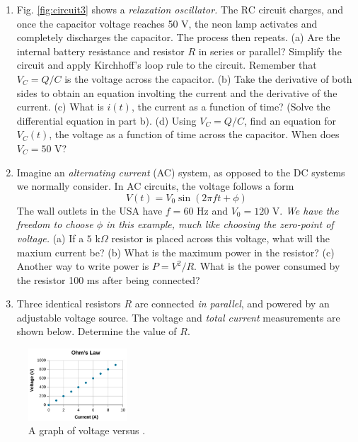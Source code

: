 \documentclass[10pt]{article}
\begin{document}
\begin{enumerate}
\item Fig. \ref{fig:circuit3} shows a \textit{relaxation oscillator.}  The RC circuit charges, and once the capacitor voltage reaches 50 V, the neon lamp activates and completely discharges the capacitor.  The process then repeats. (a) Are the internal battery resistance and resistor $R$ in series or parallel?  Simplify the circuit and apply Kirchhoff's loop rule to the circuit. Remember that $V_C = Q/C$ is the voltage across the capacitor.  (b) Take the derivative of both sides to obtain an equation involting the current and the derivative of the current.  (c) What is $i(t)$, the current as a function of time? (Solve the differential equation in part b). (d) Using $V_C = Q/C$, find an equation for $V_C(t)$, the voltage as a function of time across the capacitor.  When does $V_C = 50$ V? \\ \vspace{3cm}
\item Imagine an \textit{alternating current} (AC) system, as opposed to the DC systems we normally consider.  In AC circuits, the voltage follows a form
\begin{equation}
V(t) = V_0 \sin(2\pi f t + \phi)
\end{equation}
The wall outlets in the USA have $f = 60$ Hz and $V_0 = 120$ V.  \textit{We have the freedom to choose $\phi$ in this example, much like choosing the zero-point of voltage.}  (a) If a $5$ k$\Omega$ resistor is placed across this voltage, what will the maxium current be?  (b) What is the maximum power in the resistor?  (c) Another way to write power is $P = V^2 / R$.  What is the power consumed by the resistor 100 ms after being connected?  \\ \vspace{2cm} 
\item Three identical resistors $R$ are connected \textit{in parallel}, and powered by an adjustable voltage source. The voltage and \textit{total current} measurements are shown below. Determine the value of $R$.
\end{enumerate}

\begin{figure}[hb]
\centering
\includegraphics[width=0.33\textwidth]{ohm1.png}
\caption{\label{fig:ohm1} A graph of voltage versus .}
\end{figure}
\end{document}
